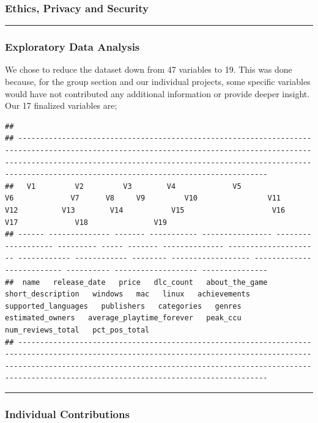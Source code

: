 \documentclass[
]{article}
\begin{document}
\subsubsection{Ethics, Privacy and
Security}\label{ethics-privacy-and-security}

\hfill\break

\begin{center}\rule{0.5\linewidth}{0.5pt}\end{center}

\subsubsection{Exploratory Data
Analysis}\label{exploratory-data-analysis}

\hfill\break

We chose to reduce the dataset down from 47 variables to 19. This was
done because, for the group section and our individual projects, some
specific variables would have not contributed any additional information
or provide deeper insight.\\

Our 17 finalized variables are;

\begin{verbatim}
## 
## ---------------------------------------------------------------------------------------------------------------------------------------------------------------------------------------------------------------------------------------------------------------------------
##   V1         V2         V3        V4             V5                V6             V7      V8     V9         V10                V11              V12          V13        V14           V15                    V16                V17             V18               V19      
## ------ -------------- ------- ----------- ---------------- ------------------- --------- ----- ------- -------------- --------------------- ------------ ------------ -------- ------------------ -------------------------- ---------- ------------------- ---------------
##  name   release_date   price   dlc_count   about_the_game   short_description   windows   mac   linux   achievements   supported_languages   publishers   categories   genres   estimated_owners   average_playtime_forever   peak_ccu   num_reviews_total   pct_pos_total 
## ---------------------------------------------------------------------------------------------------------------------------------------------------------------------------------------------------------------------------------------------------------------------------
\end{verbatim}

\begin{center}\rule{0.5\linewidth}{0.5pt}\end{center}

\subsubsection{Individual Contributions}\label{individual-contributions}
\end{document}
